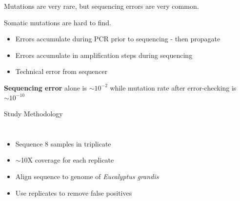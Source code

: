 \documentclass{beamer}
\begin{document}
\begin{frame}{Mutations are very rare, but sequencing errors are very common.}

Somatic mutations are hard to find.

\begin{itemize}
\item Errors accumulate during PCR prior to sequencing - then propagate
\item Errors accumulate in amplification steps during sequencing
\item Technical error from sequencer
\end{itemize}

\textbf{Sequencing error} alone is \textbf{$\sim10^{-2}$} while mutation rate after error-checking is \textbf{$\sim10^{-10}$}

\end{frame}

\begin{frame}{Study Methodology}
\begin{columns}

\begin{itemize}
\item Sequence 8 samples in triplicate
\item $\sim$10X coverage for each replicate
\item Align sequence to genome of \textit{Eucalyptus grandis}
\item Use replicates to remove false positives
\end{itemize}

\begin{center}
\end{center}
\end{columns}
\end{frame}
\end{document}
